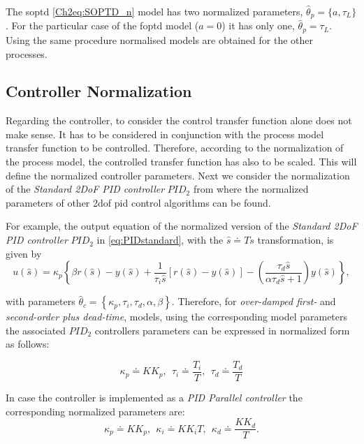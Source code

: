 The \gls{soptd} \eqref{Ch2eq:SOPTD_n} model has two normalized parameters, $\hat{\theta}_p = \{a, \tau_L\}$.  For the particular case of the \gls{foptd} model ($a=0$) it has only one, $\hat{\theta}_p = \tau_L$. Using the same procedure normalised models are obtained for the other processes.

\subsection{Controller Normalization}
\label{sec:4.2}

Regarding the controller, to consider the control transfer function alone does not make sense. It has to be considered in conjunction with the process model transfer function to be controlled. Therefore, according to the normalization of the process model, the controlled transfer function has also to be scaled. This will define the normalized controller parameters. Next we consider the normalization of the \emph{Standard 2DoF PID controller} $PID_2$ from where the normalized parameters of other \gls{2dof} \gls{pid} control algorithms can be found.

For example, the output equation of the normalized version of the \emph{Standard 2DoF PID controller} $PID_2$ in \eqref{eq:PIDstandard}, with the $\hat s \doteq T s$ transformation, is given by
\begin{equation}
	u(\hat s) = \kappa_p \left\{\beta r(\hat s)-y(\hat s) + \frac{1}{\tau_i \hat s} \left[r(\hat s)-y(\hat s)\right] - \left(\frac{\tau_d \hat s}{\alpha \tau_d \hat s+1}\right) y(\hat s)\right\},
\end{equation}

\noindent with parameters $\hat{\theta}_c = \left\{\kappa_p, \tau_i, \tau_d, \alpha, \beta \right\}$. Therefore,  for \emph{over-damped first-} and \emph{second-order plus dead-time},  models, using the corresponding model parameters the associated $PID_2$ controllers parameters can be expressed in normalized form as follows:

\begin{equation}
	\kappa_p \doteq K K_p, \ \ \tau_i \doteq \frac{T_i}{T}, \ \ \tau_d \doteq \frac{T_d}{T} 
	\label{Ch2eq:PIDNormalized}
\end{equation}

In case the controller is implemented as a \emph{PID Parallel controller} the corresponding normalized parameters are:
\begin{equation}
	\kappa_p \doteq K K_p, \ \ \kappa_i \doteq K K_i T, \ \ \kappa_d \doteq \frac{K K_d}{T}.	
\end{equation}


